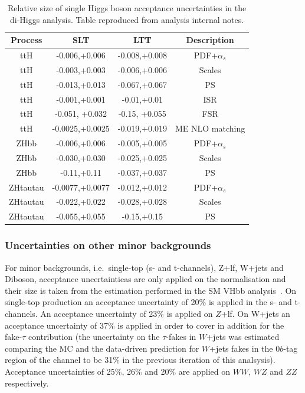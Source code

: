 \begin{table}
\centering
\small
\begin{tabular}{|c|c|c|c|}
\hline
Process   & SLT  & LTT  & Description\\
\hline
ttH  & -0.006,+0.006 & -0.008,+0.008   & PDF+$\alpha_s$ \\
ttH  & -0.003,+0.003 & -0.006,+0.006   & Scales\\
ttH  & -0.013,+0.013 & -0.067,+0.067  & PS\\
ttH  & -0.001,+0.001 & -0.01,+0.01  & ISR\\
ttH  & -0.051, +0.032 & -0.15, +0.055  & FSR\\
ttH  & -0.0025,+0.0025 & -0.019,+0.019  & ME NLO matching\\
ZHbb  & -0.006,+0.006 & -0.005,+0.005   & PDF+$\alpha_s$\\
ZHbb  & -0.030,+0.030 & -0.025,+0.025   & Scales\\
ZHbb  & -0.11,+0.11 & -0.037,+0.037   & PS\\
ZHtautau  & -0.0077,+0.0077 & -0.012,+0.012   & PDF+$\alpha_s$\\
ZHtautau  & -0.022,+0.022 & -0.028,+0.028   & Scales\\
ZHtautau  & -0.055,+0.055 & -0.15,+0.15   & PS\\
\hline
\end{tabular}
\caption{Relative size of single Higgs boson acceptance uncertainties in the di-Higgs analysis.
Table reproduced from analysis internal notes.}
\label{sec:systs:tab:systematics_singleHiggs_AcceptanceNumbers}
\end{table}



\subsubsection{Uncertainties on other minor backgrounds}
\label{subsec:uncertainties_minor_bkgs}

For minor backgrounds, i.e.\ single-top (s- and t-channels), 
Z+lf, W+jets and Diboson, acceptance uncertaintieas are 
only applied on the normalisation and their size is taken from the 
estimation performed in the SM VHbb analysis~\cite{ATLAS-CONF-2020-006, AlKhoury:2690042}.  
On single-top production an acceptance uncertainty of 20\% is applied  
in the s- and t-channels. 
An acceptance uncertainty of 23\% is applied on $Z$+lf. 
On W+jets an acceptance uncertainty of 37\% is applied 
in order to cover in addition for the fake-$\tau$ contribution 
(the uncertainty on the $\tau$-fakes in $W$+jets was estimated comparing 
the MC and the data-driven prediction for $W$+jets fakes in the 
0$b$-tag region of the \lephad channel to be 31\% in the previous iteration of this analsysis). 
Acceptance uncertainties of 25\%, 26\% and 20\% are applied on $WW$, $WZ$ and $ZZ$ respectively.









